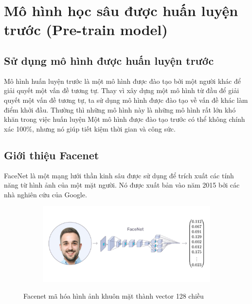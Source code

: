 \newpage
\section{Mô hình học sâu được huấn luyện trước (Pre-train model)}
\subsection{Sử dụng mô hình được huấn luyện trước}

Mô hình huấn luyện trước là một mô hình được đào tạo bởi một người khác để giải quyết
một vấn đề tương tự. Thay vì xây dựng một mô hình từ đầu để giải quyết một vấn đề tương tự,
ta sử dụng mô hình được đào tạo về vấn đề khác làm điểm khởi đầu.
Thường thì những mô hình này là những mô hình rất lớn khó khăn trong việc huấn luyện
Một mô hình được đào tạo trước có thể không chính xác 100\%,
nhưng nó giúp tiết kiệm thời gian và công sức.

\subsection{Giới thiệu Facenet}

FaceNet\cite{FaceNet} là một mạng lưới thần kinh sâu được sử dụng để trích xuất các tính năng từ
hình ảnh của một mặt người. Nó được xuất bản vào năm 2015 bởi các nhà nghiên cứu của Google.

\begin{figure}
    \begin{subfigure}{1.\textwidth}
        \begin{center}
            \includegraphics[width=1.\linewidth]{Chapters/items/chap2_17.jpg}
        \end{center}
        \label{fig: chap2_17}
    \end{subfigure}
    \caption{Facenet mã hóa hình ảnh khuôn mặt thành vector 128 chiều}
\end{figure}

